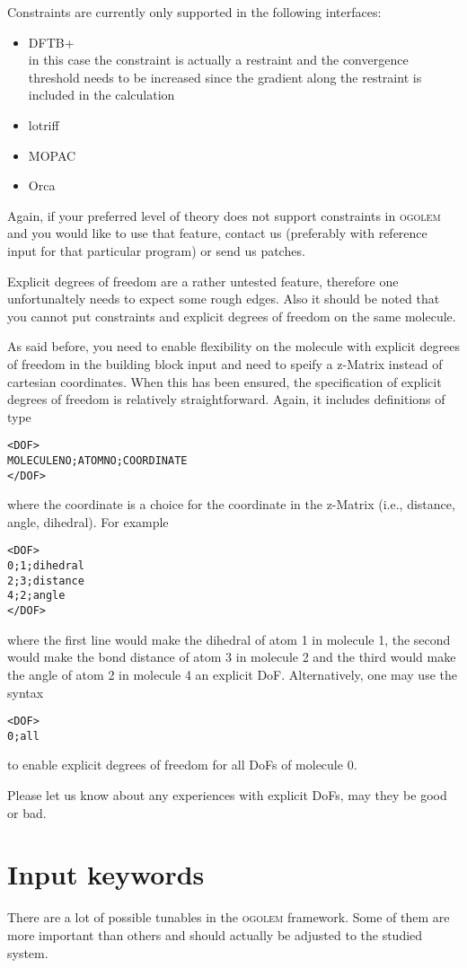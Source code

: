 \documentclass[a4paper,10pt]{scrbook}
\newcommand{\ogo}{\textsc{ogolem}}
\begin{document}
Constraints are currently only supported in the following interfaces:
\begin{itemize}
  \item DFTB+\\
	in this case the constraint is actually a restraint and the convergence
threshold needs to be increased since the gradient along the restraint is
included in the calculation
  \item lotriff
  \item MOPAC
  \item Orca
\end{itemize}
Again, if your preferred level of theory does not support constraints in \ogo{}
and you would like to use that feature, contact us (preferably with reference
input for that particular program) or send us patches.

Explicit degrees of freedom are a rather untested feature, therefore one
unfortunaltely needs to expect some rough edges. Also it should be noted that
you cannot put constraints and explicit degrees of freedom on the same molecule.

As said before, you need to enable flexibility on the molecule with explicit
degrees of freedom in the building block input and need to speify a z-Matrix
instead of cartesian coordinates. When this has been ensured, the specification 
of explicit
degrees of freedom is relatively straightforward. Again, it includes
definitions of type
\begin{verbatim}
<DOF>
MOLECULENO;ATOMNO;COORDINATE
</DOF>
\end{verbatim}
where the coordinate is a choice for the coordinate in the z-Matrix
(i.e., distance, angle, dihedral). For example
\begin{verbatim}
<DOF>
0;1;dihedral
2;3;distance
4;2;angle
</DOF>
\end{verbatim}
where the first line would make the dihedral of atom 1 in
molecule 1, the second would make the bond distance 
of atom 3 in molecule 2 and the third would make the angle of
atom 2 in molecule 4 an explicit DoF. Alternatively, one may use the syntax
\begin{verbatim}
<DOF>
0;all
\end{verbatim}
to enable explicit degrees of freedom for all DoFs of molecule 0.

Please let us know about any experiences with explicit DoFs, may they be good
or bad.

\section{Input keywords}
There are a lot of possible tunables in the \ogo{} framework. Some of them are
more important than others and should actually be adjusted to the studied
system.
\end{document}
